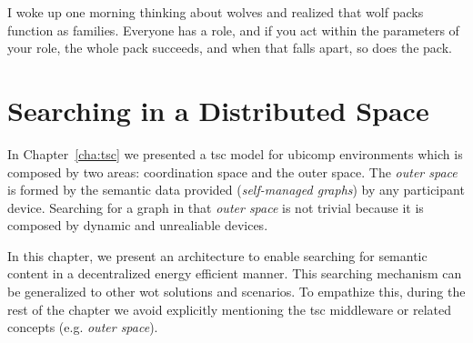 
\begin{savequote}[50mm]
I woke up one morning thinking about wolves and realized that wolf packs function as families.
Everyone has a role, and if you act within the parameters of your role, the whole pack succeeds, and when that falls apart, so does the pack.
\end{savequote}


\chapter{Searching in a Distributed Space}
\label{cha:searching}
\newcommand{\pathchapfour}{4_search}


\newcommand{\Space}{\emph{Space}} %
\newcommand{\Spaces}{\emph{Spaces}} %
\newcommand{\consumer}{\emph{Consumer}}
\newcommand{\consumers}{\emph{Consumers}}
\newcommand{\provider}{\emph{Provider}}
\newcommand{\providers}{\emph{Providers}}
\newcommand{\clue}{\emph{clue}}
\newcommand{\clues}{\emph{clues}}


\ifpdf
    \graphicspath{{\pathchapfour/figures/PNG/}{\pathchapfour/figures/PDF/}{\pathchapfour/figures/}}
\else
    \graphicspath{{\pathchapfour/figures/EPS/}{\pathchapfour/figures/}}
\fi



In Chapter~\ref{cha:tsc} we presented a \ac{tsc} model for \ac{ubicomp} environments which is composed by two areas: coordination space and the outer space.
The \emph{outer space} is formed by the semantic data provided (\emph{self-managed graphs}) by any participant device.
Searching for a graph in that \emph{outer space} is not trivial because it is composed by dynamic and unrealiable devices.

In this chapter, we present an architecture to enable searching for semantic content in a decentralized energy efficient manner.
This searching mechanism can be generalized to other \ac{wot} solutions and scenarios.
To empathize this, during the rest of the chapter we avoid explicitly mentioning the \ac{tsc} middleware or related concepts (e.g. \emph{outer space}).

